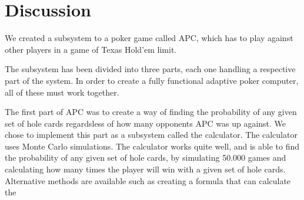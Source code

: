 \section{Discussion}
We created a subsystem to a poker game called APC, which has to play against other players in a game of Texas Hold'em limit.

The subsystem has been divided into three parts, each one handling a respective part of the system. In order to create a fully functional adaptive poker computer, all of these must work together.

The first part of APC was to create a way of finding the probability of any given set of hole cards regardsless of how many opponents APC was up against.
We chose to implement this part as a subsystem called the calculator. The calculator uses Monte Carlo simulations. The calculator works quite well, and is able to find the probability of any given set of hole cards, by simulating 50.000 games and calculating how many times the player will win with a given set of hole cards. 
Alternative methods are available such as creating a formula that can calculate the 